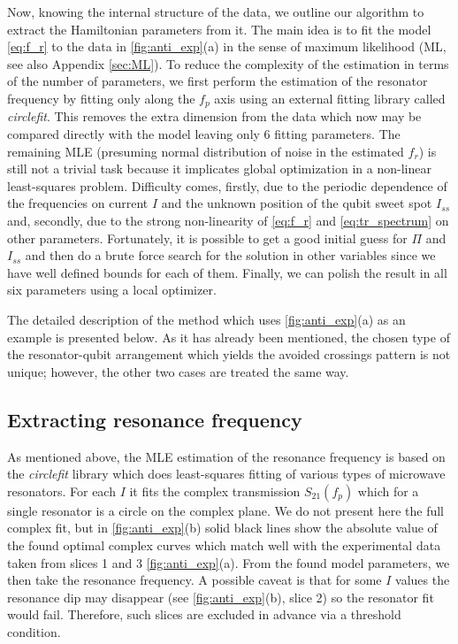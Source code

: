 \documentclass[%
 aip,
 draft,
 amsmath,amssymb,
 reprint,%
]{revtex4-1}
\begin{document}
Now, knowing the internal structure of the data, we outline our algorithm to extract the Hamiltonian parameters from it. The main idea is to fit the model \eqref{eq:f_r} to the data in \autoref{fig:anti_exp}(a) in the sense of maximum likelihood\cite{bishop2006} (ML, see also Appendix \ref{sec:ML}). To reduce the complexity of the estimation in terms of the number of parameters, we first perform the estimation of the resonator frequency by fitting only along the $f_p$ axis using an external fitting library called \textit{circlefit}\cite{probst2015}. This removes the extra dimension from the data which now may be compared directly with the model leaving only 6 fitting parameters. The remaining MLE (presuming normal distribution of noise in the estimated $f_r$) is still not a trivial task because it implicates global optimization in a non-linear least-squares problem. Difficulty comes, firstly, due to the periodic dependence of the frequencies on current $I$ and the unknown position of the qubit sweet spot $I_{ss}$ and, secondly, due to the strong non-linearity of \eqref{eq:f_r} and \eqref{eq:tr_spectrum} on other parameters. Fortunately, it is possible to get a good initial guess for $\Pi$ and $I_{ss}$ and then do a brute force search for the solution in other variables since we have well defined bounds for each of them. Finally, we can polish the result in all six parameters using a local optimizer.

The detailed description of the method which uses \autoref{fig:anti_exp}(a) as an example is presented below. As it has already been mentioned, the chosen type of the resonator-qubit arrangement which yields the avoided crossings pattern is not unique; however, the other two cases are treated the same way.

\subsection{Extracting resonance frequency}\label{sec:extract_fr}

As mentioned above, the MLE estimation of the resonance frequency is based on the \textit{circlefit} library which does least-squares fitting of various types of microwave resonators. For each $I$ it fits the complex transmission $S_{21}(f_p)$ which for a single resonator is a circle on the complex plane\cite{probst2015}. We do not present here the full complex fit, but in \autoref{fig:anti_exp}(b) solid black lines show the absolute value of the found optimal complex curves which match well with the experimental data taken from slices 1 and 3 \autoref{fig:anti_exp}(a). From the found model parameters, we then take the resonance frequency. A possible caveat is that for some $I$ values the resonance dip may disappear (see \autoref{fig:anti_exp}(b), slice 2) so the resonator fit would fail. Therefore, such slices are excluded in advance via a threshold condition.
\end{document}
